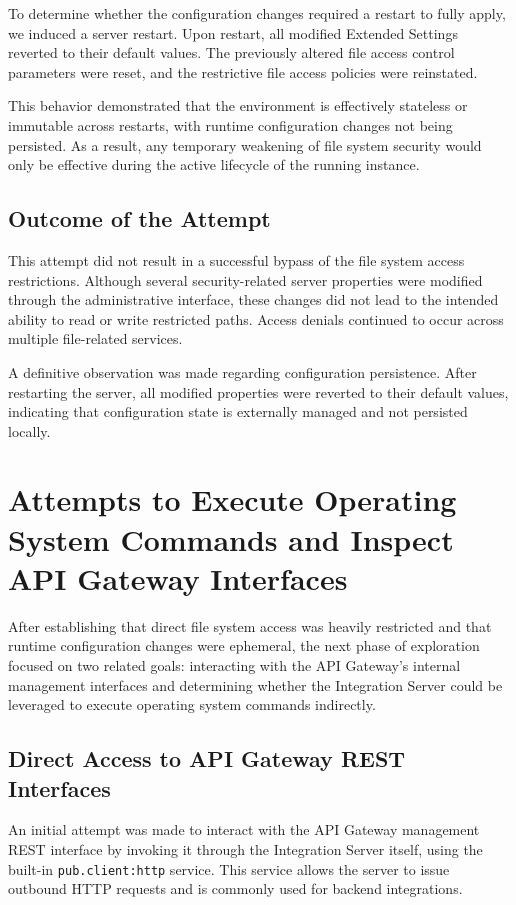 \documentclass[12pt,a4paper]{report}
\begin{document}
To determine whether the configuration changes required a restart to fully apply, we induced a server restart. Upon restart, all modified Extended Settings reverted to their default values. The previously altered file access control parameters were reset, and the restrictive file access policies were reinstated.

This behavior demonstrated that the environment is effectively stateless or immutable across restarts, with runtime configuration changes not being persisted. As a result, any temporary weakening of file system security would only be effective during the active lifecycle of the running instance.

\subsection{Outcome of the Attempt}

This attempt did not result in a successful bypass of the file system access restrictions. Although several security-related server properties were modified through the administrative interface, these changes did not lead to the intended ability to read or write restricted paths. Access denials continued to occur across multiple file-related services.

A definitive observation was made regarding configuration persistence. After restarting the server, all modified properties were reverted to their default values, indicating that configuration state is externally managed and not persisted locally.


\clearpage
\section{Attempts to Execute Operating System Commands and Inspect API Gateway Interfaces}

After establishing that direct file system access was heavily restricted and that runtime configuration changes were ephemeral, the next phase of exploration focused on two related goals: interacting with the API Gateway’s internal management interfaces and determining whether the Integration Server could be leveraged to execute operating system commands indirectly.

\subsection{Direct Access to API Gateway REST Interfaces}
An initial attempt was made to interact with the API Gateway management REST interface by invoking it through the Integration Server itself, using the built-in \texttt{pub.client:http} service. This service allows the server to issue outbound HTTP requests and is commonly used for backend integrations.
\end{document}
